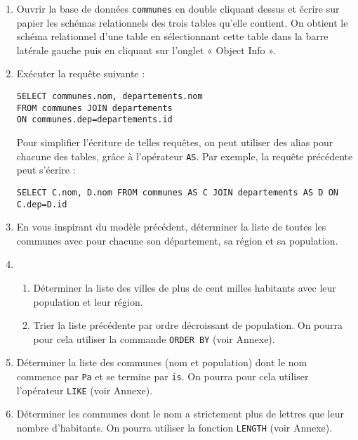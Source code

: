 \begin{enumerate}
 \item Ouvrir la base de données \verb|communes| en double cliquant dessus et écrire sur papier les schémas relationnels des trois tables qu'elle contient. On obtient le schéma relationnel d'une table en sélectionnant cette table dans la barre latérale gauche puis en cliquant sur l'onglet « Object Info ».
 
 \item Exécuter la requête suivante :
 
 \verb|SELECT communes.nom, departements.nom|\\
 \verb|FROM communes JOIN departements|\\
 \verb|ON communes.dep=departements.id|

 Pour simplifier l'écriture de telles requêtes, on peut utiliser des alias pour chacune des tables, grâce à l'opérateur \verb|AS|. Par exemple, la requête précédente peut s'écrire :
 
 \verb|SELECT C.nom, D.nom FROM communes AS C JOIN departements AS D ON C.dep=D.id|
 
 \item En vous inspirant du modèle précédent, déterminer la liste de toutes les communes avec pour chacune son département, sa région et sa population.
 
\item \begin{enumerate}
\item Déterminer la liste des villes de plus de cent milles habitants avec leur population et leur région.                                                                                                    
\item Trier la liste précédente par ordre décroissant de population. On pourra pour cela utiliser la commande \verb|ORDER BY| (voir Annexe).
\end{enumerate}

\item Déterminer la liste des communes (nom et population) dont le nom commence par \verb|Pa| et se termine par \verb|is|. On pourra pour cela utiliser l'opérateur \verb|LIKE| (voir Annexe).

\item Déterminer les communes dont le nom a strictement plus de lettres que leur nombre d'habitants. On pourra utiliser la fonction \verb|LENGTH| (voir Annexe).
\end{enumerate}


